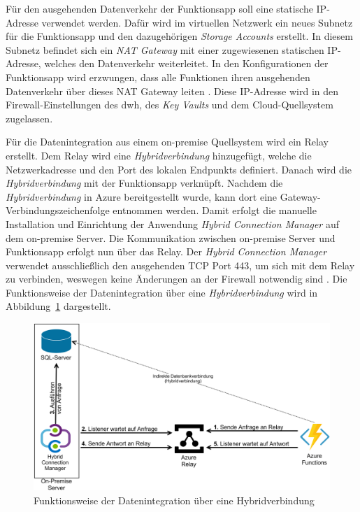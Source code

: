 Für den ausgehenden Datenverkehr der Funktionsapp soll eine statische IP-Adresse verwendet werden. Dafür wird im virtuellen Netzwerk ein neues Subnetz für die Funktionsapp und den dazugehörigen \textit{Storage Accounts} erstellt. In diesem Subnetz befindet sich ein \textit{NAT Gateway} mit einer zugewiesenen statischen IP-Adresse, welches den Datenverkehr weiterleitet. In den Konfigurationen der Funktionsapp wird erzwungen, dass alle Funktionen ihren ausgehenden Datenverkehr über dieses NAT Gateway leiten \cite[vgl.][]{msdoc_22_func_ip}. Diese IP-Adresse wird in den Firewall-Einstellungen des \ac{dwh}, des \textit{Key Vaults} und dem Cloud-Quellsystem zugelassen.

Für die Datenintegration aus einem on-premise Quellsystem wird ein Relay erstellt. Dem Relay wird eine \textit{Hybridverbindung} hinzugefügt, welche die Netzwerkadresse und den Port des lokalen Endpunkts definiert. Danach wird die \textit{Hybridverbindung} mit der Funktionsapp verknüpft. Nachdem die \textit{Hybridverbindung} in Azure bereitgestellt wurde, kann dort eine Gateway-Verbindungszeichenfolge entnommen werden. Damit erfolgt die manuelle Installation und Einrichtung der Anwendung \textit{Hybrid Connection Manager} auf dem on-premise Server. Die Kommunikation zwischen on-premise Server und Funktionsapp erfolgt nun über das Relay. Der \textit{Hybrid Connection Manager} verwendet ausschließlich den ausgehenden TCP Port 443, um sich mit dem Relay zu verbinden, weswegen keine Änderungen an der Firewall notwendig sind \cite[vgl.][]{msdoc_22_func_hybridConn}. Die Funktionsweise der Datenintegration über eine \textit{Hybridverbindung} wird in Abbildung~\ref{fig:chap04_hybridConn} dargestellt.

 \begin{figure}[htbp]
 \centering
 \includegraphics[width=\textwidth]{gfx/hybridverbindung.png}
 \caption[Datenintegration über Hybridverbindung]{Funktionsweise der Datenintegration über eine Hybridverbindung \cite[vgl.][]{msdoc_22_func_hybridConn, msdoc_21_hybridConn_protocol}}
\label{fig:chap04_hybridConn}
\end{figure}

